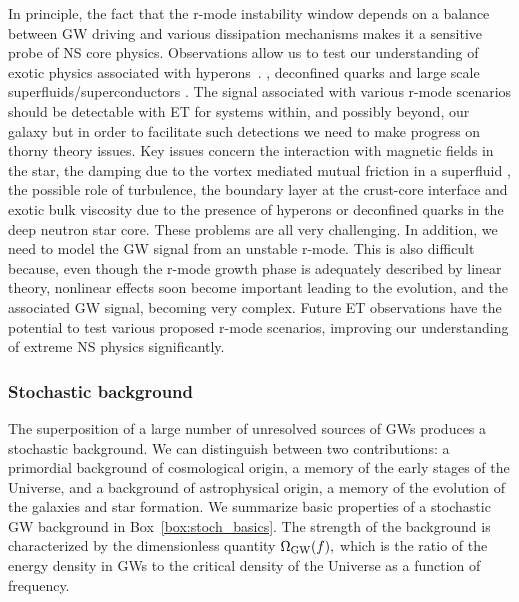 In principle, the fact that the r-mode instability window depends on 
a balance between GW driving and various dissipation mechanisms makes 
it a sensitive probe of NS core physics.  Observations allow us to 
test our understanding of exotic physics associated with 
hyperons~\cite{LindblomOwen2002, Lackey2006}. , deconfined quarks and 
large scale superfluids/superconductors \cite{Living:AnderssonComer}. 
The signal associated with various r-mode scenarios should be 
detectable with ET for systems within, and possibly beyond, our 
galaxy \cite{Bondarescu:2009}
but in order to facilitate such detections we need to make progress 
on thorny theory issues. Key issues concern the interaction with 
magnetic fields in the star, the damping due to the vortex mediated 
mutual friction in a superfluid , the possible role of turbulence, 
the boundary layer at the crust-core interface and exotic bulk viscosity 
due to the presence of hyperons or deconfined quarks in the deep 
neutron star core. These problems are all very challenging. In addition, 
we need to  model the GW signal from an unstable r-mode. This is also 
difficult because, even though the r-mode growth phase is adequately 
described by linear theory, nonlinear effects soon become important 
leading to the evolution, and the  associated GW signal, becoming 
very complex.  Future ET observations have the potential to test 
various proposed r-mode scenarios, improving our understanding of 
extreme NS physics significantly.   


\FloatBarrier
\subsubsection{Stochastic background} \label{source_stochastic}
The superposition of a large number of unresolved sources of GWs 
produces a stochastic background.  We can distinguish between two 
contributions: a primordial background of cosmological origin, a 
memory of the early stages of the Universe, and a background of 
astrophysical origin, a memory of the evolution of the galaxies 
and star formation. We summarize basic properties of a stochastic 
GW background in Box~\ref{box:stoch_basics}. The strength of the
background is characterized by the dimensionless quantity
$\Omega_{\rm GW}(f),$ which is the ratio of the energy density
in GWs to the critical density of the Universe as a function
of frequency. 

